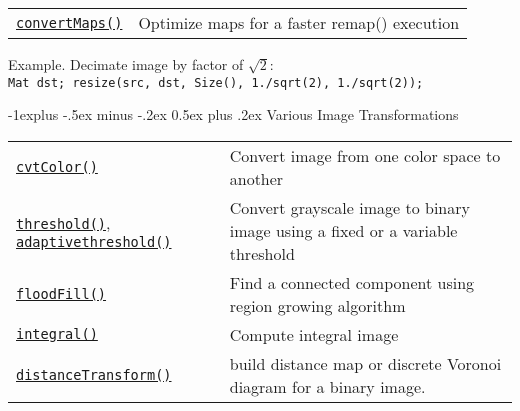 \documentclass[10pt,landscape]{article}
\makeatletter
\renewcommand{\subsection}{\@startsection{subsection}{2}{0mm}%
                                {-1explus -.5ex minus -.2ex}%
                                {0.5ex plus .2ex}%
                                {\normalfont\normalsize\bfseries}}
\makeatother
\begin{document}
\begin{multicols}{3}
\begin{tabular}{@{}p{\the\MyLen}%
                @{}p{\linewidth-\the\MyLen}@{}}
\texttt{\href{http://opencv.willowgarage.com/documentation/cpp/imgproc_geometric_image_transformations.html\#cv-convertmaps}{convertMaps()}} & Optimize maps for a faster remap() execution\\

\end{tabular}

\begin{tabbing}
Example. Decimate image by factor of $\sqrt{2}$:\\
\texttt{Mat dst; resize(src, dst, Size(), 1./sqrt(2), 1./sqrt(2));}
\end{tabbing}

\subsection{Various Image Transformations}

\begin{tabular}{@{}p{\the\MyLen}%
                @{}p{\linewidth-\the\MyLen}@{}}

\texttt{\href{http://opencv.willowgarage.com/documentation/cpp/imgproc_miscellaneous_image_transformations.html\#cvtColor}{cvtColor()}} & Convert image from one color space to another \\

\texttt{\href{http://opencv.willowgarage.com/documentation/cpp/imgproc_miscellaneous_image_transformations.html\#threshold}{threshold()}}, \texttt{\href{http://opencv.willowgarage.com/documentation/cpp/imgproc_miscellaneous_image_transformations.html\#adaptivethreshold}{adaptivethreshold()}} & Convert grayscale image to binary image using a fixed or a variable threshold \\

\texttt{\href{http://opencv.willowgarage.com/documentation/cpp/imgproc_miscellaneous_image_transformations.html\#floodfill}{floodFill()}} & Find a connected component using region growing algorithm\\

\texttt{\href{http://opencv.willowgarage.com/documentation/cpp/imgproc_miscellaneous_image_transformations.html\#floodfill}{integral()}} & Compute integral image \\

\texttt{\href{http://opencv.willowgarage.com/documentation/cpp/imgproc_miscellaneous_image_transformations.html\#distancetransform}{distanceTransform()}}
 & build distance map or discrete Voronoi diagram for a binary image. \\


\end{tabular}
\end{multicols}
\end{document}
